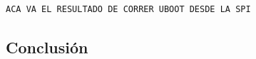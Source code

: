 \begin{lstlisting}[frame=single,caption={Salida de la ejecución del programa de prueba ejecutado en Linux Embebido},label={lst:salidalinux}]
 ACA VA EL RESULTADO DE CORRER UBOOT DESDE LA SPI
\end{lstlisting}		
		
		\subsection{Conclusión}
